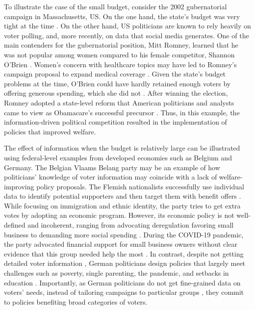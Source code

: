 \documentclass[12pt,english]{article}
\begin{document}
To illustrate the case of the small budget, consider the 2002 gubernatorial campaign in Massachusetts, US. On the one hand, the state's budget was very tight at the time \citep{NPR2011RomneyBudget}. On the other hand, US politicians are known to rely heavily on voter polling, and, more recently, on data that social media generates. 
One of the main contenders for the gubernatorial position, Mitt Romney, learned that he was not popular among women compared to his female competitor, Shannon O'Brien \citep{Freedlander2023}. Women's concern with healthcare topics \citep{Shuppy2008} may have led to Romney's campaign proposal to expand medical coverage \citep{Ebbert2002}. Given the state's budget problems at the time, O'Brien could have hardly retained enough voters by offering generous spending, which she did not \citep{Freedlander2023}. After winning the election, Romney adopted a state-level reform that American politicians and analysts came to view as Obamacare's successful precursor \citep{Thrush2012}. Thus, in this example, the information-driven political competition resulted in the implementation of policies that improved welfare.   

The effect of information when the budget is relatively large can be illustrated using federal-level examples from developed economies such as Belgium and Germany. The Belgian Vlaams Belang party may be an example of how politicians' knowledge of voter information may coincide with a lack of welfare-improving policy proposals. The Flemish nationalists successfully use individual data to identify potential supporters and then target them with benefit offers \citep{brusselstimes2023,Belga2022FlemishParty}. While focusing on immigration and ethnic identity, the party tries to get extra votes by adopting an economic program. However, its economic policy is not well-defined and incoherent, ranging from advocating deregulation favoring small business \citep{coffe2008small} to demanding more social spending \citep{Chini2022FlemishVlaamsBelang}. During the COVID-19 pandemic, the party advocated financial support for small business owners without clear evidence that this group needed help the most \citep{Sijstermans2021VlaamsBelangA}.  
In contrast, despite not getting detailed voter information \citep{kruschinski2017restrictions}, German politicians design policies that largely meet challenges such as poverty, single parenting, the pandemic, and setbacks in education \citep{SGI2020GermanySocial}. Importantly, as German politicians do not get fine-grained data on voters' needs, instead of tailoring campaigns to particular groups \citep{khazan2013}, they commit to policies benefiting broad categories of voters. 
\end{document}
